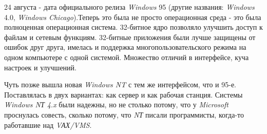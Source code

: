 24 августа - дата официального релиза \textit{Windows} 95 (другие названия: \textit{Windows} 4.0, \textit{Windows Chicago}).Теперь это была не просто операционная среда - это была полноценная операционная система. 32-битное ядро позволяло улучшить доступ к файлам и сетевым функциям. 32-битные приложения были лучше защищены от ошибок друг друга, имелась и поддержка многопользовательского режима на одном компьютере с одной системой. Множество отличий в интерфейсе, куча настроек и улучшений.

Чуть позже вышла новая \textit{Windows NT} с тем же интерфейсом, что и 95-е. Поставлялась в двух вариантах: как сервер и как рабочая станция. Системы \textit{Windows NТ 4.x} были надежны, но не столько потому, что у \textit{Microsoft} проснулась совесть, сколько потому, что \textit{NТ} писали программисты, когда-то работавшие над \textit{VАХ/VMS}.

